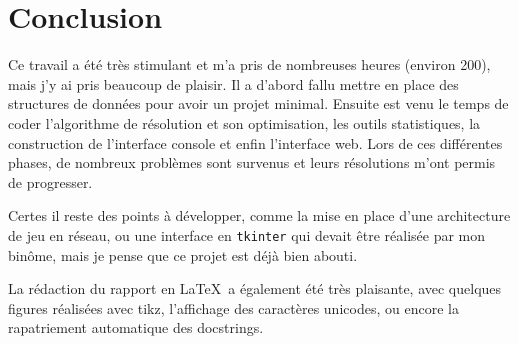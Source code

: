 \chapter{Conclusion}
Ce travail a été très stimulant et m'a pris de nombreuses heures (environ 200), mais j'y ai pris beaucoup de plaisir. Il a d'abord fallu mettre en place des structures de données pour avoir un projet minimal. Ensuite est venu le temps de coder l'algorithme de résolution et son optimisation, les outils statistiques, la construction de l'interface console et enfin l'interface web. Lors de ces différentes phases, de nombreux problèmes sont survenus et leurs résolutions m'ont permis de progresser.

Certes il reste des points à développer, comme la mise en place d'une architecture de jeu en réseau, ou une interface en \texttt{tkinter} qui devait être réalisée par mon binôme, mais je pense que ce projet est déjà bien abouti. 

La rédaction du rapport en \LaTeX\ a également été très plaisante, avec quelques figures réalisées avec tikz, l'affichage des caractères unicodes, ou encore la rapatriement automatique des docstrings. 
%
%
